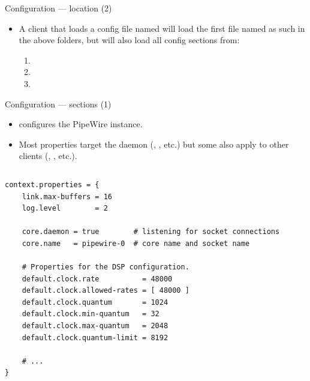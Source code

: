 \begin{frame}{Configuration — location (2)}
  \begin{itemize}

  \item A client that loads a config file named 
    will load the first file named as such in the above folders, but
    will also load all config sections from:

    \begin{enumerate}
    \item {}
    \item {}
    \item {}
    \end{enumerate}

  \end{itemize}
\end{frame}



\begin{frame}[fragile]{Configuration — sections (1)}

  \begin{itemize}

  \item {} configures the PipeWire instance.

  \item Most properties target the daemon
    (,
    , etc.) but some also apply to
    other clients (, , etc.).

  \end{itemize}

  \begin{columns}
    \begin{block}{}
      \fontsize{7.3}{7.3}\selectfont
        \begin{verbatim}
context.properties = {
    link.max-buffers = 16
    log.level        = 2

    core.daemon = true        # listening for socket connections
    core.name   = pipewire-0  # core name and socket name

    # Properties for the DSP configuration.
    default.clock.rate          = 48000
    default.clock.allowed-rates = [ 48000 ]
    default.clock.quantum       = 1024
    default.clock.min-quantum   = 32
    default.clock.max-quantum   = 2048
    default.clock.quantum-limit = 8192

    # ...
}
        \end{verbatim}
      \end{block}
  \end{columns}

\end{frame}



